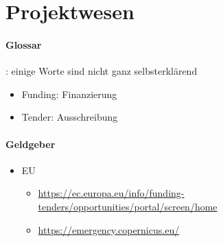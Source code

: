 \section{Projektwesen}

\paragraph{Glossar}: einige Worte sind nicht ganz selbsterklärend

\begin{itemize}
    \item Funding: Finanzierung
    \item Tender: Ausschreibung
\end{itemize}


\paragraph{Geldgeber}
\begin{itemize}
    \item EU
    \begin{itemize}
        \item \href{H2020}{https://ec.europa.eu/info/funding-tenders/opportunities/portal/screen/home}
        \item \href{Copernicus}{https://emergency.copernicus.eu/}
    \end{itemize}
\end{itemize}


